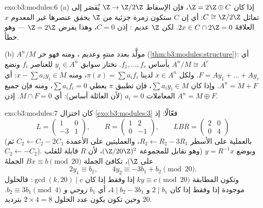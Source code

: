 \begin{solution}{exo:b3:modules:6}
(a) إذا كان $\Z = 2\Z \oplus C$، فإن الإسقاط $\Z \to \Z/2\Z$ يُقصَر إلى
تماثل $C \cong \Z/2\Z$: أي إن $C$ ستكون زمرة جزئية من $\Z$
يحقق عنصرها غير المعدوم $x$ العلاقةَ $2x \in C
\cap 2\Z = 0$. لكن $\Z$ عديم
: إذن $C = 0$، وهذا يفرض $\Z =
2\Z$ --- وهو خطأ.

(b)  $A^n/M$ مولَّد بعدد منتهٍ وعديم ، ومنه فهو حر
(\cref{thm:b3:modules:structure}): أي $A^n/M \cong A^r$ بأساس $f_1, \dots, f_r$. نختار سوابق
$y_i \in A^n$ للعناصر $f_i$ ونضع $F = Ay_1 + \dots + Ay_r$. ولكل $x \in A^n$ لدينا
$\pi(x)
= \sum a_if_i$، ومنه $x - \sum a_iy_i \in M$: أي $A^n = M + F$. وإذا كان $\sum a_iy_i \in M$، فإن
تطبيق $\pi$ يعطي $\sum a_if_i = 0$، ومنه فإن جميع المعاملات $a_i = 0$ (لأن
العائلة أساس): أي $M \cap F = 0$. إذن $A^n = M \oplus
F$.
\end{solution}

\begin{solution}{exo:b3:modules:7}
كان اختزال \cref{exo:b3:modules:3} فعّالًا: إذ
\[
L = \begin{pmatrix} 1 & 0\\ -3 & 1\end{pmatrix},
\qquad
R = \begin{pmatrix} 1 & 2\\ 0 & -1 \end{pmatrix},
\qquad
LBR = \begin{pmatrix} 2 & 0\\ 0 & 4\end{pmatrix}
\]
(بالعملية على الأسطر $R_2 \leftarrow R_2 - 3R_1$، والعمليتين على الأعمدة $C_2 \leftarrow C_2 - 2C_1$ ثم
$C_2 \leftarrow -C_2$). وبوضع $y = R^{-1}x$ (وهو تقابل للمجموعة
$(\Z/20\Z)^2$، لأن $R$ قابلة للقلب على $\Z$)، تكافئ الجملة
$Bx \equiv b \pmod{20}$ الجملةَ
\[
2y_1 \equiv b_1, \qquad 4y_2 \equiv -3b_1 + b_2 \pmod{20}.
\]
وتكون المطابقة $ky \equiv c \pmod{20}$  إذا وفقط إذا كان $\gcd(k, 20) \mid c$:
فالحلول موجودة إذا وفقط إذا كان $2 \mid b_1$ و $4
\mid b_2 - 3b_1$، أي
\emph{$b_1$ زوجي و $b_2 \equiv 3b_1
\pmod 4$}. وحين تكون  يكون عدد
الحلول $2 \times 4 = 8$ بترديد $20$.
\end{solution}

